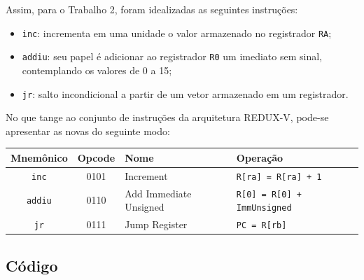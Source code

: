 \documentclass[twocolumn, 11pt]{article}
\begin{document}
Assim, para o Trabalho 2, foram idealizadas as seguintes instruções:

\begin{itemize}
    \item \texttt{inc}: incrementa em uma unidade o valor armazenado no registrador \texttt{RA};
    \item \texttt{addiu}: seu papel é adicionar ao registrador \texttt{R0} um imediato sem sinal, contemplando os valores de 0 a 15;
    \item \texttt{jr}: salto incondicional a partir de um vetor armazenado em um registrador.
\end{itemize}

No que tange ao conjunto de instruções da arquitetura REDUX-V, pode-se apresentar as novas do seguinte modo:

\begin{center}
\renewcommand{\arraystretch}{1.1} %
\setlength{\tabcolsep}{2pt} %
\begin{tabular}{|c|c|p{2cm}|p{3cm}|}
\hline
\textbf{Mnemônico} & \textbf{Opcode} & \textbf{Nome} & \textbf{Operação} \\ \hline
\texttt{inc} & 0101 & Increment & \texttt{R[ra] = R[ra] + 1} \\ \hline
\texttt{addiu} & 0110 & Add Immediate Unsigned & \texttt{R[0] = R[0] + ImmUnsigned} \\ \hline
\texttt{jr} & 0111 & Jump Register & \texttt{PC = R[rb]} \\ \hline
\end{tabular}
\end{center}

\subsection{Código}
\end{document}
